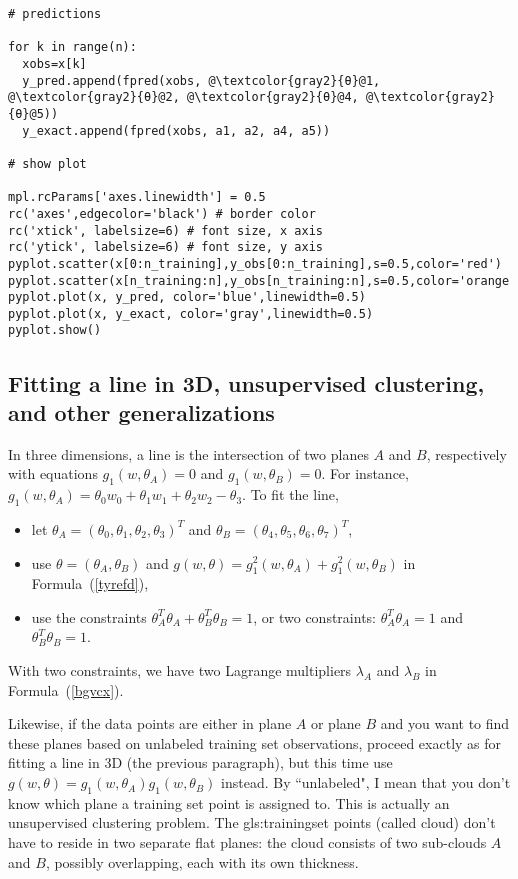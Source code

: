 \documentclass[oneside,10pt]{book}
\begin{document}
\begin{lstlisting}[escapechar=@]
# predictions

for k in range(n):
  xobs=x[k]
  y_pred.append(fpred(xobs, @\textcolor{gray2}{θ}@1, @\textcolor{gray2}{θ}@2, @\textcolor{gray2}{θ}@4, @\textcolor{gray2}{θ}@5))
  y_exact.append(fpred(xobs, a1, a2, a4, a5))

# show plot

mpl.rcParams['axes.linewidth'] = 0.5
rc('axes',edgecolor='black') # border color
rc('xtick', labelsize=6) # font size, x axis
rc('ytick', labelsize=6) # font size, y axis
pyplot.scatter(x[0:n_training],y_obs[0:n_training],s=0.5,color='red')
pyplot.scatter(x[n_training:n],y_obs[n_training:n],s=0.5,color='orange')
pyplot.plot(x, y_pred, color='blue',linewidth=0.5)
pyplot.plot(x, y_exact, color='gray',linewidth=0.5)
pyplot.show()
\end{lstlisting}

\subsection{Fitting a line in 3D, unsupervised clustering, and other generalizations}

In three dimensions, a line is the intersection of two planes $A$ and $B$, respectively with equations
$g_1(w,\theta_A)=0$ and $g_1(w,\theta_B)=0$. For instance, $g_1(w,\theta_A)=\theta_0 w_0 + \theta_1 w_1 +\theta_2 w_2
- \theta_3$. To fit the line, \vspace{1ex}
\begin{itemize}
\item let $\theta_A=(\theta_0,\theta_1,\theta_2,\theta_3)^T$ and $\theta_B=(\theta_4,\theta_5,\theta_6,\theta_7)^T$,
\item use $\theta=(\theta_A,\theta_B)$ and $g(w,\theta)=g_1^2(w,\theta_A)+g_1^2(w,\theta_B)$ in Formula~(\ref{tyrefd}),
\item use the constraints  $\theta_A^T\theta_A + \theta_B^T\theta_B=1$, or two constraints: $\theta_A^T\theta_A=1$ and $\theta_B^T\theta_B=1$.
\end{itemize}
 With two constraints, we have two
Lagrange multipliers $\lambda_A$ and $\lambda_B$ in Formula~(\ref{bgvcx}).

Likewise, if the data points are either in plane $A$ or plane $B$ and you want to find these planes based on unlabeled training set observations, proceed exactly as for fitting a line in 3D (the
 previous paragraph), but this time use $g(w,\theta)=g_1(w,\theta_A)g_1(w,\theta_B)$ instead. By ``unlabeled", I mean that you don't know which plane a training set point is assigned to.   This is actually an unsupervised clustering problem. The \gls{gls:trainingset} points (called cloud) don't have to reside
 in two separate flat planes: the cloud consists of two sub-clouds $A$ and $B$, possibly overlapping, each with its own thickness.
\end{document}
